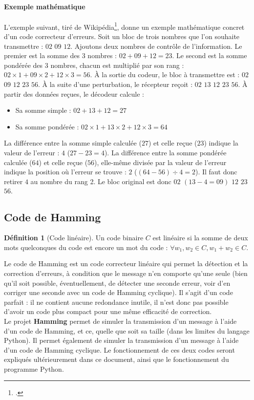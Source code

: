 \documentclass[a4paper]{article}
\numberwithin{equation}{section}
\theoremstyle{definition}
\newtheorem{definition}{Définition}[section]
\begin{document}
\paragraph{Exemple mathématique} L'exemple suivant, tiré de Wikipédia\footcite{wikipedia:codes-correcteurs}, donne un exemple mathématique concret d'un code correcteur d'erreurs. Soit un bloc de trois nombres que l'on souhaite transmettre : $02$ $09$ $12$. Ajoutons deux nombres de contrôle de l'information. Le premier est la somme des 3 nombres : $02 + 09 + 12 = 23$. Le second est la somme pondérée des 3 nombres, chacun est multiplié par son rang : $02 \times 1 + 09 \times 2 + 12 \times 3 = 56$. À la sortie du codeur, le bloc à transmettre est : $02$ $09$ $12$ $23$ $56$. À la suite d’une perturbation, le récepteur reçoit : $02$ $13$ $12$ $23$ $56$. À partir des données reçues, le décodeur calcule :
\begin{itemize}
  \item Sa somme simple : $02 + 13 + 12 = 27$
  \item Sa somme pondérée : $02 \times 1 + 13 \times 2 + 12 \times 3 = 64$
\end{itemize}
La différence entre la somme simple calculée ($27$) et celle reçue ($23$) indique la valeur de l'erreur : $4$ ($27 - 23 = 4$). La différence entre la somme pondérée calculée ($64$) et celle reçue ($56$), elle-même divisée par la valeur de l'erreur indique la position où l'erreur se trouve : $2$ ($(64 - 56) \div 4 = 2$). Il faut donc retirer $4$ au nombre du rang 2. Le bloc original est donc $02$ $(13 - 4 = 09)$ $12$ $23$ $56$.

\subsection{Code de Hamming}


\begin{definition}[Code linéaire]
Un code binaire $C$ est linéaire si la somme de deux mots quelconques du code est encore un mot du code : $\forall w_1, w_2 \in C, w_1 + w_2 \in C$.
\end{definition}

Le code de Hamming est un code correcteur linéaire qui permet la détection et la correction d'erreurs, à condition que le message n'en comporte qu'une seule (bien qu'il soit possible, éventuellement, de détecter une seconde erreur, voir d'en corriger une seconde avec un code de Hamming cyclique). Il s'agit d'un code parfait : il ne contient aucune redondance inutile, il n'est donc pas possible d'avoir un code plus compact pour une même efficacité de correction. \\

Le projet \textbf{Hamming} permet de simuler la transmission d'un message à l'aide d'un code de Hamming, et ce, quelle que soit sa taille (dans les limites du langage Python). Il permet également de simuler la transmission d'un message à l'aide d'un code de Hamming cyclique. Le fonctionnement de ces deux codes seront expliqués ultérieurement dans ce document, ainsi que le fonctionnement du programme Python.


\newpage
\clearpage

\printbibliography

\setcounter{page}{1}
\end{document}
